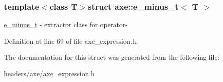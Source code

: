 \subsubsection*{template$<$class T$>$struct axe\+::e\+\_\+minus\+\_\+t$<$ T $>$}

\hyperlink{structaxe_1_1e__minus__t}{e\+\_\+minus\+\_\+t} -\/ extractor class for operator-\/ 

Definition at line 69 of file axe\+\_\+expression.\+h.



The documentation for this struct was generated from the following file\+:\begin{DoxyCompactItemize}
\item 
headers/axe/axe\+\_\+expression.\+h\end{DoxyCompactItemize}
